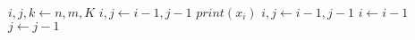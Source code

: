 \begin{algorithm}
    \begin{algorithmic}
            \State $i,j,k \gets n, m, K$
                    \State $i,j \gets i - 1, j - 1$
                    \State $print(x_i)$
                    \State $i,j \gets i - 1, j - 1$
                    \State $i \gets i - 1$
                    \State $j \gets j - 1$
                \EndIf
            \EndWhile
        \EndProcedure
    \end{algorithmic}
\end{algorithm}
